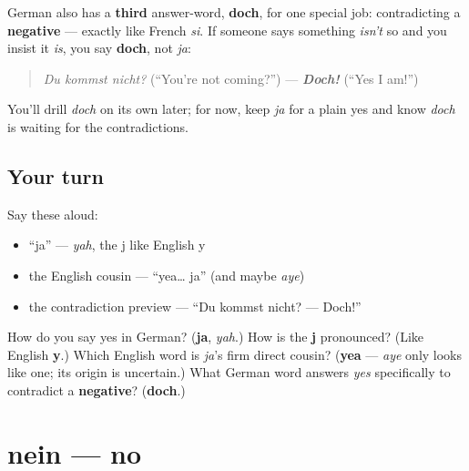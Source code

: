 \begin{grammarlens}[title={Grammar Lens: A German habit to file away}]
German also has a \textbf{third} answer-word, \textbf{doch}, for one special job: contradicting a \textbf{negative} — exactly like French \emph{si}. If someone says something \emph{isn't} so and you insist it \emph{is}, you say \textbf{doch}, not \emph{ja}:

\begin{quote}
\emph{Du kommst nicht?} (\textquotedblleft{}You're not coming?\textquotedblright{}) — \emph{\textbf{Doch!}} (\textquotedblleft{}Yes I am!\textquotedblright{})
\end{quote}

You'll drill \emph{doch} on its own later; for now, keep \emph{ja} for a plain yes and know \emph{doch} is waiting for the contradictions.
\end{grammarlens}

\subsection*{Your turn}
Say these aloud:

\begin{itemize}
\raggedright
  \item \textquotedblleft{}ja\textquotedblright{} — \emph{yah}, the j like English y
  \item the English cousin — \textquotedblleft{}yea… ja\textquotedblright{} (and maybe \emph{aye})
  \item the contradiction preview — \textquotedblleft{}Du kommst nicht? — Doch!\textquotedblright{}
\end{itemize}

\begin{tcolorbox}[breakable,colback=teal!4,colframe=teal!35!black,title={Before you move on}]
How do you say yes in German? (\textbf{ja}, \emph{yah}.) How is the \textbf{j} pronounced? (Like English \textbf{y}.) Which English word is \emph{ja}'s firm direct cousin? (\textbf{yea} — \emph{aye} only looks like one; its origin is uncertain.) What German word answers \emph{yes} specifically to contradict a \textbf{negative}? (\textbf{doch}.)
\end{tcolorbox}
\section[nein]{nein — no}

\label{lesson:GE-C18-nein}



